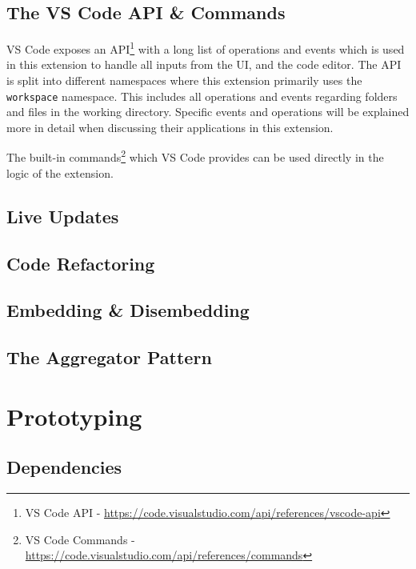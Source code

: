 
\subsection{The VS Code API \& Commands}
VS Code exposes an API\footnote{VS Code API - \url{https://code.visualstudio.com/api/references/vscode-api}} with a long list of operations and events
which is used in this extension to handle all inputs from the UI, and the code editor.
The API is split into different namespaces where this extension primarily uses the \texttt{workspace}
namespace. This includes all operations and events regarding folders and files in the working directory.
Specific events and operations will be explained more in detail when discussing their applications in this extension.

The built-in commands\footnote{VS Code Commands - \url{https://code.visualstudio.com/api/references/commands}} which VS Code provides can be used directly in the logic of the extension.

\subsection{Live Updates}
\subsection{Code Refactoring}
\subsection{Embedding \& Disembedding}
\subsection{The Aggregator Pattern}

\section{Prototyping}
\subsection{Dependencies}
\clearpage